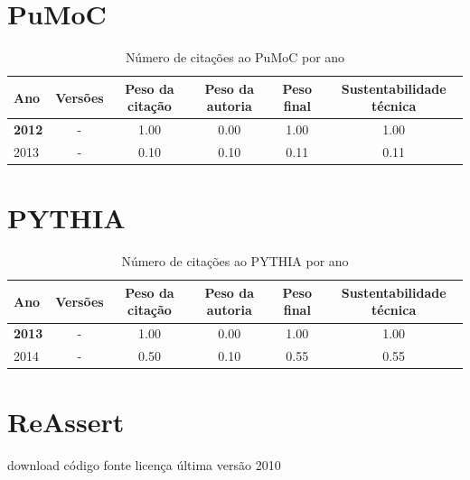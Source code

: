\section{PuMoC}


\begin{table}[H]
\caption{Número de citações ao PuMoC por ano}
\centering
\begin{tabular}{| l | c | c | c | c | c |}
  \hline
  Ano & Versões & Peso da citação & Peso da autoria & Peso final & Sustentabilidade técnica \\
  \hline
            {\bf 2012}
          &
          -
          &
          1.00
          &
          0.00
          &
          1.00
          &
            {\color{blue} 1.00}
          \\
\hline
            2013
          &
          -
          &
          0.10
          &
          0.10
          &
          0.11
          &
            {\color{red} 0.11}
          \\
\hline
\end{tabular}
\end{table}



\section{PYTHIA}


\begin{table}[H]
\caption{Número de citações ao PYTHIA por ano}
\centering
\begin{tabular}{| l | c | c | c | c | c |}
  \hline
  Ano & Versões & Peso da citação & Peso da autoria & Peso final & Sustentabilidade técnica \\
  \hline
            {\bf 2013}
          &
          -
          &
          1.00
          &
          0.00
          &
          1.00
          &
            {\color{blue} 1.00}
          \\
\hline
            2014
          &
          -
          &
          0.50
          &
          0.10
          &
          0.55
          &
            {\color{blue} 0.55}
          \\
\hline
\end{tabular}
\end{table}



\section{ReAssert}
\checkmark download
\checkmark código fonte
\checkmark licença
\checkmark última versão 2010


